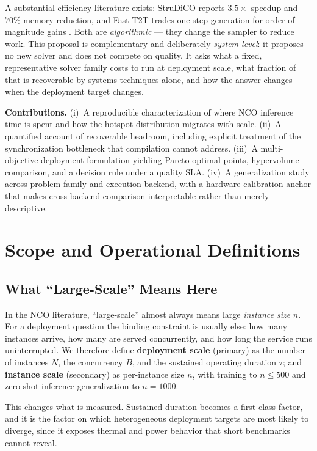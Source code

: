 \documentclass[11pt,a4paper,twocolumn]{article}
\begin{document}
A substantial efficiency literature exists: StruDiCO reports $3.5\times$ speedup
and $70\%$ memory reduction, and Fast T2T trades one-step generation for
order-of-magnitude gains \citep{wang2025strudico,li2024fastt2t}. Both are
\emph{algorithmic} --- they change the sampler to reduce work. This proposal is
complementary and deliberately \emph{system-level}: it proposes no new solver and
does not compete on quality. It asks what a fixed, representative solver family
costs to run at deployment scale, what fraction of that is recoverable by systems
techniques alone, and how the answer changes when the deployment target changes.

\textbf{Contributions.} (i)~A reproducible characterization of where NCO inference
time is spent and how the hotspot distribution migrates with scale. (ii)~A
quantified account of recoverable headroom, including explicit treatment of the
synchronization bottleneck that compilation cannot address. (iii)~A multi-objective
deployment formulation yielding Pareto-optimal points, hypervolume comparison, and
a decision rule under a quality SLA. (iv)~A generalization study across problem
family and execution backend, with a hardware calibration anchor that makes
cross-backend comparison interpretable rather than merely descriptive.

\section{Scope and Operational Definitions}

\subsection{What ``Large-Scale'' Means Here}

In the NCO literature, ``large-scale'' almost always means large \emph{instance
size} $n$. For a deployment question the binding constraint is usually else: how
many instances arrive, how many are served concurrently, and how long the service
runs uninterrupted. We therefore define \textbf{deployment scale} (primary) as the
number of instances $N$, the concurrency $B$, and the sustained operating duration
$\tau$; and \textbf{instance scale} (secondary) as per-instance size $n$, with
training to $n \le 500$ and zero-shot inference generalization to $n = 1000$.

This changes what is measured. Sustained duration becomes a first-class factor, and
it is the factor on which heterogeneous deployment targets are most likely to
diverge, since it exposes thermal and power behavior that short benchmarks cannot
reveal.
\end{document}
